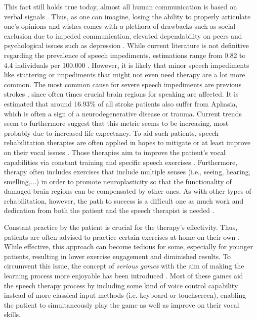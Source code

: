 \documentclass[draft,final]{vutinfth} %
\begin{document}
This fact still holds true today, almost all human communication is based on verbal signals \cite{salim2023verbal}. Thus, as one can imagine, losing the ability to properly articulate one's opinions and wishes comes with a plethora of drawbacks such as social exclusion due to impeded communication, elevated dependability on peers and psychological issues such as depression \cite{hilari2010psychological}. While current literature is not definitive regarding the prevalence of speech impediments, estimations range from 0.82 to 4.4 individuals per 100.000 \cite{swain2018congenital, duffy2021primary}. However, it is likely that minor speech impediments like stuttering or impediments that might not even need therapy are a lot more common. The most common cause for severe speech impediments are previous strokes \cite{wu2020prevalence}, since often times crucial brain regions for speaking are affected. It is estimated that around 16.93\% of all stroke patients also suffer from Aphasia, which is often a sign of a neurodegenerative disease or trauma. Current trends seem to furthermore suggest that this metric seems to be increasing, most probably due to increased life expectancy.
To aid such patients, speech rehabilitation therapies are often applied in hopes to mitigate or at least improve on their vocal issues \cite{stahl2018efficacy}. Those therapies aim to improve the patient's vocal capabilities via constant training and specific speech exercises \cite{proestler2023}. Furthermore, therapy often includes exercises that include multiple senses (i.e., seeing, hearing, smelling,...) in order to promote neuroplasticity so that the functionality of damaged brain regions can be compensated by other ones. As with other types of rehabilitation, however, the path to success is a difficult one as much work and dedication from both the patient and the speech therapist is needed \cite{musicco2003early}.

Constant practice by the patient is crucial for the therapy's effectivity. Thus, patients are often advised to practice certain exercises at home on their own \cite{musicco2003early}. While effective, this approach can become tedious for some, especially for younger patients, resulting in lower exercise engagement and diminished results. To circumvent this issue, the concept of \emph{serious games} with the aim of making the learning process more enjoyable has been introduced \cite{lv2015game}. Most of these games aid the speech therapy process by including some kind of voice control capability instead of more classical input methods (i.e. keyboard or touchscreen), enabling the patient to simultaneously play the game as well as improve on their vocal skills.
\end{document}
